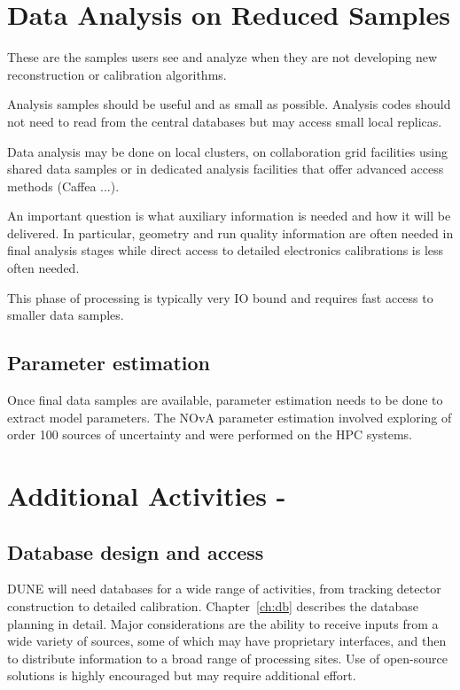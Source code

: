 \documentclass[../main-v1.tex]{subfiles}
\begin{document}
\section{Data Analysis on Reduced Samples }


These are the samples users see and analyze when they are not developing new reconstruction  or calibration algorithms. 

Analysis samples should be useful and as small as possible.  Analysis codes should not need to read from the central databases but may access small local replicas. 

Data analysis may be done on local clusters, on collaboration grid facilities using shared data samples or in dedicated analysis facilities that offer advanced access methods (Caffea ...). 

An important question is what auxiliary information is needed and how it will be delivered. In particular, geometry and run quality information are often needed in final analysis stages while direct access to detailed electronics calibrations is less often needed. 

This phase of processing is typically very IO bound and requires fast access to smaller data samples. 

\subsection{Parameter estimation}
Once final data samples are available, parameter estimation needs to be done to extract model parameters.  The NOvA parameter estimation \cite{NOvA:2021nfi} involved exploring of order 100 sources of uncertainty and were performed on the  HPC systems. 

\section{Additional Activities - }

\subsection{Database design and access}
DUNE will need databases for a wide range of activities, from tracking detector construction to detailed calibration.  Chapter~\ref{ch:db} describes the database planning in detail.  Major considerations are the ability to  receive inputs from a wide variety of sources, some of which may have proprietary interfaces, and then to distribute information to a broad range of processing sites.   Use of open-source solutions is highly encouraged but may require additional effort.
\end{document}

